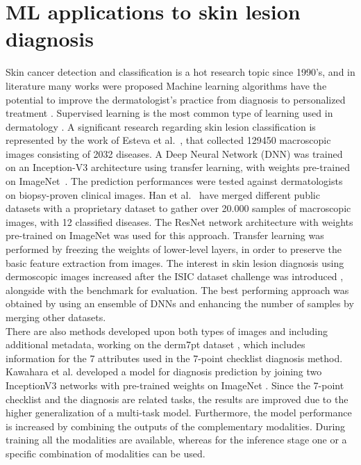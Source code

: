 \section{ML applications to skin lesion diagnosis}
Skin cancer detection and classification is a hot research topic since 1990's, and in literature many works were proposed \cite{7ptCNNforMel,estevaMLinDerm,mtl7ptCoppola,Kawahara,MLinDermat,HanWork}
Machine learning algorithms have the potential to improve the dermatologist’s practice from diagnosis to personalized treatment \cite{MLinDermat}. 
Supervised learning is the most common type of learning used in dermatology \cite{MLinDermat}.
A significant research regarding skin lesion classification is represented by the work of Esteva et al.~\cite{estevaMLinDerm}, that collected 129450 macroscopic images consisting of 2032 diseases. A Deep Neural Network (DNN) was trained on an Inception-V3 architecture using transfer learning, with weights pre-trained on ImageNet~\cite{ImageNet}. The prediction performances were tested against dermatologists on biopsy-proven clinical images.
Han et al.~\cite{HanWork} have merged different public datasets with a proprietary dataset to gather over 20.000 samples of macroscopic images, with 12 classified diseases. The ResNet \cite{Resnet} network architecture with weights pre-trained on ImageNet was used for this approach. Transfer learning was performed by freezing the weights of lower-level layers, in order to preserve the basic feature extraction from images.
The interest in skin lesion diagnosis using dermoscopic images increased after the ISIC dataset challenge was introduced \cite{IsicChallenge}, alongside with the benchmark for evaluation. The best performing approach was obtained by using an ensemble of DNNs and enhancing the number of samples by merging other datasets\cite{multiDataset}. \\
There are also methods developed upon both types of images and including additional metadata, working on the derm7pt dataset \cite{Kawahara}, which includes information for the 7 attributes used in the 7-point checklist diagnosis method.
Kawahara et al.\cite{Kawahara} developed a model for diagnosis prediction by joining two InceptionV3 networks with pre-trained weights on ImageNet \cite{ImageNet}. Since the 7-point checklist and the diagnosis are related tasks, the results are improved due to the higher generalization of a multi-task model. Furthermore, the model performance is increased by combining the outputs of the complementary modalities. During training all the modalities are available, whereas for the inference stage one or a specific combination of modalities can be used.
